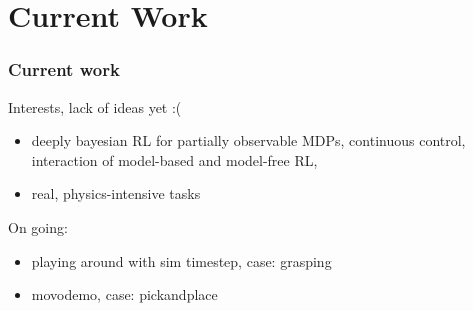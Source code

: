 \section{Current Work}

\begin{frame}
\frametitle{Current work}

Interests, lack of ideas yet :(
\begin{itemize}
  \item deeply bayesian RL for partially observable MDPs,
  continuous control, interaction of model-based and model-free RL,
  \item real, physics-intensive tasks
\end{itemize}

On going:
\begin{itemize}
  \item playing around with sim timestep, case: grasping
  \item movodemo, case: pickandplace
\end{itemize}

\end{frame}


